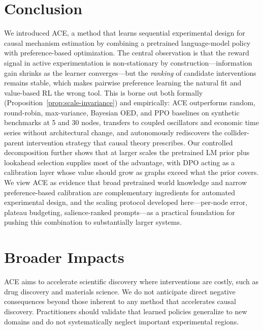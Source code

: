 \documentclass{article}
\theoremstyle{plain}
\theoremstyle{definition}
\theoremstyle{remark}
\begin{document}
\section{Conclusion}
\label{sec:conclusion}

We introduced ACE, a method that learns sequential experimental design for causal mechanism estimation by combining a pretrained language-model policy with preference-based optimization. The central observation is that the reward signal in active experimentation is non-stationary by construction---information gain shrinks as the learner converges---but the \emph{ranking} of candidate interventions remains stable, which makes pairwise preference learning the natural fit and value-based RL the wrong tool. This is borne out both formally (Proposition~\ref{prop:scale-invariance}) and empirically: ACE outperforms random, round-robin, max-variance, Bayesian OED, and PPO baselines on synthetic benchmarks at 5 and 30 nodes, transfers to coupled oscillators and economic time series without architectural change, and autonomously rediscovers the collider-parent intervention strategy that causal theory prescribes. Our controlled decomposition further shows that at larger scales the pretrained LM prior plus lookahead selection supplies most of the advantage, with DPO acting as a calibration layer whose value should grow as graphs exceed what the prior covers. We view ACE as evidence that broad pretrained world knowledge and narrow preference-based calibration are complementary ingredients for automated experimental design, and the scaling protocol developed here---per-node error, plateau budgeting, salience-ranked prompts---as a practical foundation for pushing this combination to substantially larger systems.

\section*{Broader Impacts}

ACE aims to accelerate scientific discovery where interventions are costly, such as drug discovery and materials science. We do not anticipate direct negative consequences beyond those inherent to any method that accelerates causal discovery. Practitioners should validate that learned policies generalize to new domains and do not systematically neglect important experimental regions.
\end{document}
